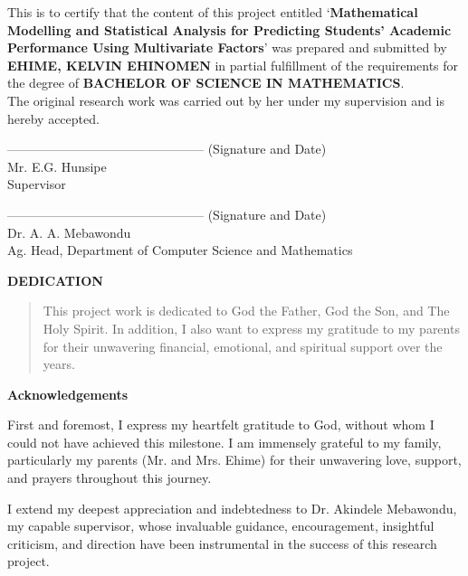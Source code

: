 \documentclass[12pt]{report}
\begin{document}
	\noindent This is to certify that the content of this project entitled ‘\textbf{Mathematical Modelling and Statistical Analysis for Predicting Students’ Academic Performance Using Multivariate Factors}’ was prepared and submitted by \textbf{EHIME, KELVIN EHINOMEN} in partial fulfillment of the requirements for the degree of \textbf{BACHELOR OF SCIENCE IN MATHEMATICS}.\\The original research work was carried out by her under my supervision and is hereby accepted.
	
	\vspace{3cm}
	\begin{center}
		-----------------------------------------------  (Signature and Date)\\
		Mr. E.G. Hunsipe\\
		Supervisor
	\end{center}
	
	\vspace{3cm}
	\begin{center}
		-----------------------------------------------  (Signature and Date)\\
		Dr. A. A. Mebawondu\\
		Ag. Head, Department of Computer Science and Mathematics
	\end{center}
	
	\newpage
	\begin{center}
		{\Large{\bf DEDICATION}}
	\end{center}
	
	\begin{quote}
		This project work is dedicated to God the Father, God the Son, and The Holy Spirit. In addition, I also want to express my gratitude to my parents for their unwavering financial, emotional, and spiritual support over the years.
	\end{quote}
	
	\newpage
	\thispagestyle{empty}
	\begin{center}
		{\Large{\bf Acknowledgements}}
	\end{center}
	
	\noindent First and foremost, I express my heartfelt gratitude to God, without whom I could not have achieved this milestone. I am immensely grateful to my family, particularly my parents (Mr. and Mrs. Ehime) for their unwavering love, support, and prayers throughout this journey.
	
	\noindent I extend my deepest appreciation and indebtedness to Dr. Akindele Mebawondu, my capable supervisor, whose invaluable guidance, encouragement, insightful criticism, and direction have been instrumental in the success of this research project.
	
\end{document}

